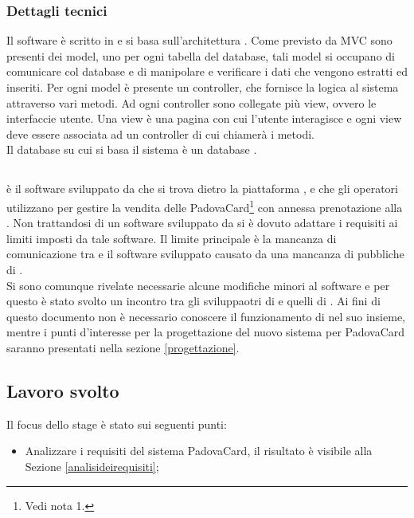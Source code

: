 \subsubsection{Dettagli tecnici}
Il software è scritto in  e si basa sull'architettura . Come previsto da MVC sono presenti dei model, uno per ogni tabella del database, tali model si occupano di comunicare col database e di manipolare e verificare i dati che vengono estratti ed inseriti.
Per ogni model è presente un controller, che fornisce la logica al sistema attraverso vari metodi. Ad ogni controller sono collegate più view, ovvero le interfaccie utente. Una view è una pagina con cui l'utente interagisce e ogni view deve essere associata ad un controller di cui chiamerà i metodi.\\

Il database su cui si basa il sistema è un database .

\subsection{\tlite}
\tlite è il software sviluppato da \charta che si trova dietro la piattaforma \vivaticket, e che gli operatori utilizzano per gestire la vendita delle PadovaCard\footnote{Vedi nota 1.} con annessa prenotazione alla \cappella.
Non trattandosi di un software sviluppato da \net si è dovuto adattare i requisiti ai limiti imposti da tale software.
Il limite principale è la mancanza di comunicazione tra \tlite e il software sviluppato causato da una mancanza di  pubbliche di \tlite.\\

Si sono comunque rivelate necessarie alcune modifiche minori al software e per questo è stato svolto un incontro tra gli sviluppaotri di \tlite e quelli di \net.
Ai fini di questo documento non è necessario conoscere il funzionamento di \tlite nel suo insieme, mentre i punti d'interesse per la progettazione del nuovo sistema per PadovaCard saranno presentati nella sezione \ref{progettazione}.

\subsection{Lavoro svolto}
Il focus dello stage è stato sui seguenti punti:
\begin{itemize}
\item Analizzare i requisiti del sistema PadovaCard, il risultato è visibile alla Sezione \ref{analisideirequisiti};
\end{itemize}

